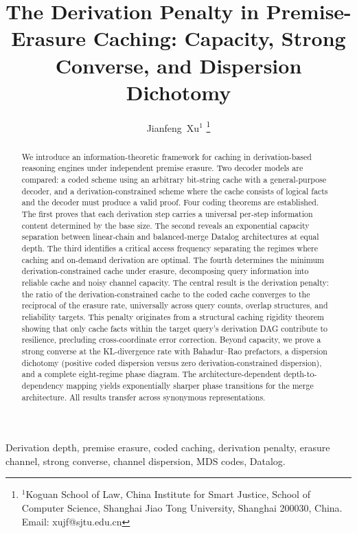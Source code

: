 \documentclass[journal]{IEEEtran}
\numberwithin{equation}{section}
\begin{document}
\title{The Derivation Penalty in Premise-Erasure Caching: Capacity, Strong Converse, and Dispersion Dichotomy}

\author{Jianfeng~Xu$^{1}$%
\thanks{$^{1}$Koguan School of Law, China Institute for Smart Justice, School of Computer Science, Shanghai Jiao Tong University, Shanghai 200030, China. Email: xujf@sjtu.edu.cn}%
}

\maketitle

\begin{abstract}
We introduce an information-theoretic framework for caching in
derivation-based reasoning engines under independent premise
erasure.
Two decoder models are compared: a coded scheme using an arbitrary
bit-string cache with a general-purpose decoder, and a
derivation-constrained scheme where the cache consists of logical
facts and the decoder must produce a valid proof.
Four coding theorems are established.
The first proves that each derivation step carries a universal
per-step information content determined by the base size.
The second reveals an exponential capacity separation between
linear-chain and balanced-merge Datalog architectures at equal
depth.
The third identifies a critical access frequency separating the
regimes where caching and on-demand derivation are optimal.
The fourth determines the minimum derivation-constrained cache
under erasure, decomposing query information into reliable cache
and noisy channel capacity.
The central result is the derivation penalty: the ratio of the
derivation-constrained cache to the coded cache converges to the
reciprocal of the erasure rate, universally across query counts,
overlap structures, and reliability targets.
This penalty originates from a structural caching rigidity
theorem showing that only cache facts within the target query's
derivation DAG contribute to resilience, precluding
cross-coordinate error correction.
Beyond capacity, we prove a strong converse at the KL-divergence
rate with Bahadur--Rao prefactors, a dispersion dichotomy
(positive coded dispersion versus zero derivation-constrained
dispersion), and a complete eight-regime phase diagram.
The architecture-dependent depth-to-dependency mapping yields
exponentially sharper phase transitions for the merge
architecture.
All results transfer across synonymous representations.
\end{abstract}

\begin{IEEEkeywords}
Derivation depth,
premise erasure,
coded caching,
derivation penalty,
erasure channel,
strong converse,
channel dispersion,
MDS codes,
Datalog.
\end{IEEEkeywords}
\end{document}
